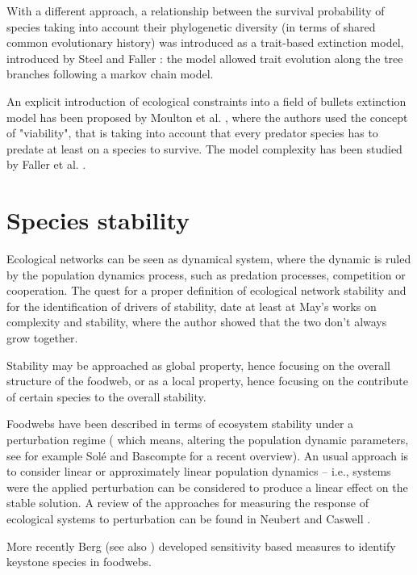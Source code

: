 \documentclass[12pt,a4paper]{report}
\begin{document}
With a different approach, a relationship between the survival probability of species taking into account their phylogenetic diversity (in terms of shared common evolutionary history) was introduced as a trait-based extinction model, introduced by Steel and Faller \cite{steel2009markovian, faller2012trait}: the model allowed trait evolution along the tree branches following a markov chain model.

An explicit introduction of ecological constraints into a field of bullets extinction model has been proposed by Moulton et al. \cite{moulton2007optimizing}, where the authors used the concept of "viability", that is taking into account that every predator species has to predate at least on a species to survive. The model complexity has been studied by Faller et al. \cite{faller2011optimizing}.

\section{Species stability}\label{species_stability}
Ecological networks can be seen as dynamical system, where the dynamic is ruled by the population dynamics process, such as predation processes, competition or cooperation. The quest for a proper definition of ecological network stability and for the identification of drivers of stability, date at least at May's works \cite{may1971stability, may1972will} on complexity and stability, where the author showed that the two don't always grow together.

Stability may be approached as global property, hence focusing on the overall structure of the foodweb, or as a local property, hence focusing on the contribute of certain species to the overall stability.

Foodwebs have been described in terms of ecosystem stability under a perturbation regime ( which means, altering the population dynamic parameters, see for example Sol\'{e} and Bascompte \cite{sole2006self} for a recent overview). An usual approach is to consider linear or approximately linear population dynamics -- i.e., systems were the applied perturbation can be considered to produce a linear effect on the stable solution. A review of the approaches for measuring the response of ecological systems to perturbation can be found in Neubert and Caswell \cite{neubert1997alternatives}.

More recently Berg \cite{berg2013community} (see also \cite{berg2011using}) developed sensitivity based measures to identify keystone species in foodwebs.
\end{document}
